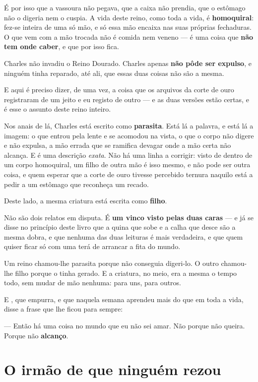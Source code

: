 \documentclass[livro.tex]{subfiles}
\begin{document}
É por isso que a vassoura não pegava, que a caixa não prendia, que o estômago não o digeria nem o
cuspia. A vida deste reino, como toda a vida, é \textbf{homoquiral}: fez-se inteira de uma só
mão, e só essa mão encaixa nas suas próprias fechaduras. O que vem com a mão trocada não é comida
nem veneno --- é uma coisa que \textbf{não tem onde caber}, e que por isso fica.

Charles não invadiu o Reino Dourado. Charles apenas \textbf{não pôde ser expulso}, e ninguém
tinha reparado, até ali, que essas duas coisas não são a mesma.

\medskip

E aqui é preciso dizer, de uma vez, a coisa que os arquivos da corte de ouro registraram de um
jeito e eu registo de outro --- e as duas versões estão certas, e é esse o assunto deste
reino inteiro.

Nos anais de lá, Charles está escrito como \textbf{parasita}. Está lá a palavra, e está lá a
imagem: o que entrou pela lente e se acomodou na vista, o que o corpo não digere e não expulsa,
a mão errada que se ramifica devagar onde a mão certa não alcança. E é uma descrição
\emph{exata}. Não há uma linha a corrigir: visto de dentro de um corpo homoquiral, um filho de
outra mão é isso mesmo, e não pode ser outra coisa, e quem esperar que a corte de ouro tivesse
percebido ternura naquilo está a pedir a um estômago que reconheça um recado.

Deste lado, a mesma criatura está escrita como \textbf{filho}.

Não são dois relatos em disputa. É \textbf{um vinco visto pelas duas caras} --- e já se disse no
princípio deste livro que a quina que sobe e a calha que desce são a mesma dobra, e que nenhuma
das duas leituras é mais verdadeira, e que quem quiser ficar só com uma terá de arrancar a fita
do mundo.

Um reino chamou-lhe parasita porque não conseguia digeri-lo. O outro chamou-lhe filho porque o
tinha gerado. E a criatura, no meio, era a mesma o tempo todo, sem mudar de mão nenhuma:
\Mon para uns, \Val para outros.

E \Yas , que empurra, e que naquela semana aprendeu mais do que em toda a vida, disse a frase que
lhe ficou para sempre:

--- Então há uma coisa no mundo que eu não sei amar. Não porque não queira. Porque não
\textbf{alcanço}.

\chapter{O irmão de que ninguém rezou}
\end{document}
